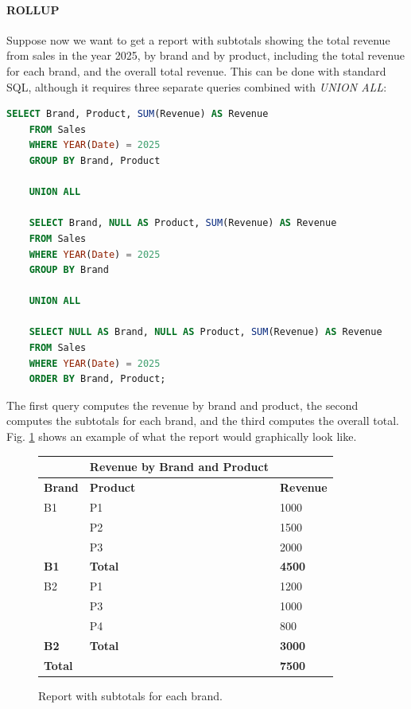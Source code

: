 \paragraph{ROLLUP}
Suppose now we want to get a report with subtotals showing the total revenue from sales in the year 2025, by brand and by product, including the total revenue for each brand, and the overall total revenue. This can be done with standard SQL, although it requires three separate queries combined with \textit{UNION ALL}:
\begin{lstlisting}[language=SQL]
    SELECT Brand, Product, SUM(Revenue) AS Revenue
    FROM Sales
    WHERE YEAR(Date) = 2025
    GROUP BY Brand, Product

    UNION ALL
    
    SELECT Brand, NULL AS Product, SUM(Revenue) AS Revenue
    FROM Sales
    WHERE YEAR(Date) = 2025
    GROUP BY Brand

    UNION ALL

    SELECT NULL AS Brand, NULL AS Product, SUM(Revenue) AS Revenue
    FROM Sales
    WHERE YEAR(Date) = 2025
    ORDER BY Brand, Product;
\end{lstlisting}
The first query computes the revenue by brand and product, the second computes the subtotals for each brand, and the third computes the overall total. Fig. \ref{fig:report_rollup} shows an example of what the report would graphically look like.
\begin{figure}[H]
    \centering
    \begin{tabular}{lll}
        \hline
        & \textbf{Revenue by Brand and Product} & \\
        \hline
        \textbf{Brand} & \textbf{Product} & \textbf{Revenue} \\
        \hline
        B1 & P1 & 1000 \\
        & P2 & 1500 \\
        & P3 & 2000 \\
        \textbf{B1} & \textbf{Total} & \textbf{4500} \\
        B2 & P1 & 1200 \\
        & P3 & 1000 \\
        & P4 & 800 \\
        \textbf{B2} & \textbf{Total} & \textbf{3000} \\
        \textbf{Total} & & \textbf{7500} \\
        \hline
    \end{tabular}
    \caption{Report with subtotals for each brand.}
    \label{fig:report_rollup}
\end{figure}

